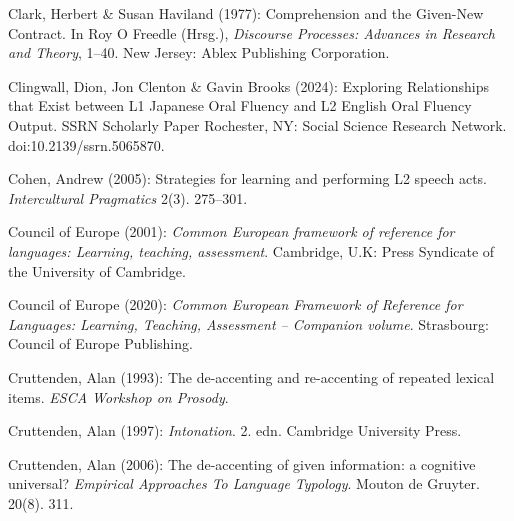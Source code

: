 \begin{styleBibliography}
Clark, Herbert \& Susan Haviland (1977): Comprehension and the Given-New Contract. In Roy O Freedle (Hrsg.), \textit{Discourse Processes: Advances in Research and Theory}, 1–40. New Jersey: Ablex Publishing Corporation.
\end{styleBibliography}

\begin{styleBibliography}
Clingwall, Dion, Jon Clenton \& Gavin Brooks (2024): Exploring Relationships that Exist between L1 Japanese Oral Fluency and L2 English Oral Fluency Output. SSRN Scholarly Paper Rochester, NY: Social Science Research Network. doi:10.2139/ssrn.5065870.
\end{styleBibliography}

\begin{styleBibliography}
Cohen, Andrew (2005): Strategies for learning and performing L2 speech acts. \textit{Intercultural Pragmatics} 2(3). 275–301.
\end{styleBibliography}

\begin{styleBibliography}
Council of Europe (2001): \textit{Common European framework of reference for languages: Learning, teaching, assessment}. Cambridge, U.K: Press Syndicate of the University of Cambridge.
\end{styleBibliography}

\begin{styleBibliography}
Council of Europe (2020): \textit{Common European Framework of Reference for Languages: Learning, Teaching, Assessment – Companion volume}. Strasbourg: Council of Europe Publishing.
\end{styleBibliography}

\begin{styleBibliography}
Cruttenden, Alan (1993): The de-accenting and re-accenting of repeated lexical items. \textit{ESCA Workshop on Prosody}.
\end{styleBibliography}

\begin{styleBibliography}
Cruttenden, Alan (1997): \textit{Intonation}. 2. edn. Cambridge University Press.
\end{styleBibliography}

\begin{styleBibliography}
Cruttenden, Alan (2006): The de-accenting of given information: a cognitive universal? \textit{Empirical Approaches To Language Typology}. Mouton de Gruyter. 20(8). 311.
\end{styleBibliography}

